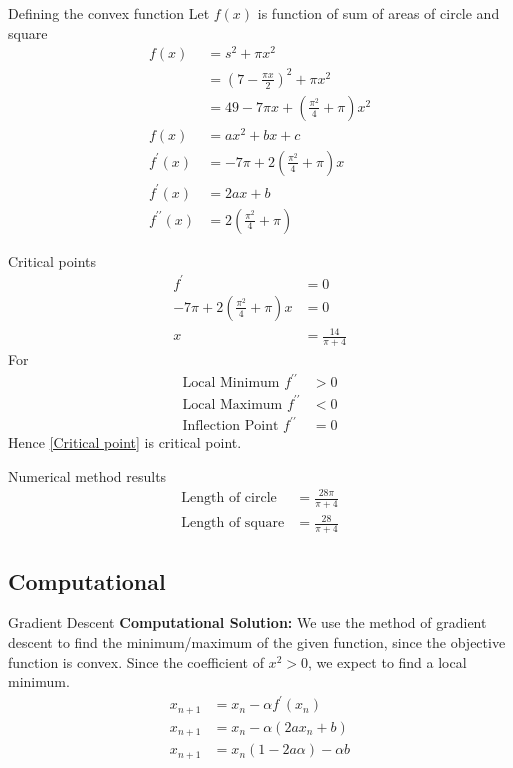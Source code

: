 \documentclass{beamer}
\providecommand{\brak}[1]{\ensuremath{\left(#1\right)}}
\theoremstyle{remark}
\numberwithin{equation}{section}
\begin{document}
\begin{frame}{Defining the convex function}
    Let $f\brak{x}$ is function of sum of areas of circle and square
    \begin{align}
        f\brak{x} &= s^2 + \pi x^2\\
         &= \brak{7 - \frac{\pi x}{2}}^2 + \pi x^2\\
         &= 49 - 7\pi x + \brak{\frac{\pi^2}{4} + \pi}x^2\\
        f\brak{x} &= ax^2 + bx + c \\
        f^{\prime}\brak{x} &= -7\pi + 2\brak{\frac{\pi^2}{4} + \pi}x\\
        f^{\prime}\brak{x} &= 2ax + b\\
        f^{\prime\prime}\brak{x} &= 2\brak{\frac{\pi^2}{4} + \pi}
    \end{align}
\end{frame}

\begin{frame}{Critical points}
    \begin{align}
        f^{\prime} &= 0\\
        -7\pi + 2\brak{\frac{\pi^2}{4} + \pi}x &= 0\\
        x &= \frac{14}{\pi + 4} \label{Critical point}
    \end{align}
    For
    \begin{align}
        \text{Local Minimum } f^{\prime\prime} &> 0\\
        \text{Local Maximum } f^{\prime\prime} &< 0\\
        \text{Inflection Point } f^{\prime\prime} &= 0
    \end{align}
    Hence \eqref{Critical point} is critical point.
\end{frame}
\begin{frame}{Numerical method results}
    \begin{align}
        \text{Length of circle } &= \frac{28\pi}{\pi + 4}\\
        \text{Length of square} &= \frac{28}{\pi + 4}
    \end{align}
\end{frame}

\subsection{Computational}
\begin{frame}{Gradient Descent}
    \textbf{Computational Solution:}
    We use the method of gradient descent to find the minimum/maximum of the given function, since the objective function is convex. Since the coefficient of $x^2 > 0$, we expect to find a local minimum.
    \begin{align}
        x_{n + 1} &= x_n - \alpha f^{\prime}\brak{x_n}\\
        x_{n + 1} &= x_n - \alpha \brak{2ax_n + b}\\
        x_{n + 1} &= x_n \brak{1 - 2a\alpha} - \alpha b \label{z}
    \end{align}
\end{frame}
\end{document}
